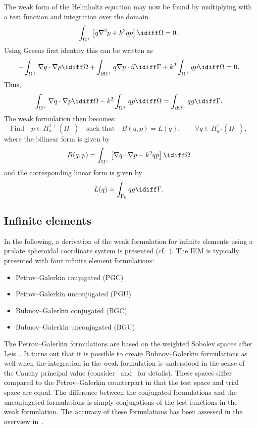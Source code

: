 The weak form of the Helmholtz equation may now be found by multiplying  with a test function and integration over the domain
\begin{equation*}
	\int_{\Omega^+} \left[q\nabla^2 p + k^2 qp\right]\idiff \Omega = 0.
\end{equation*}
Using Greens first identity this can be written as
\begin{equation*}
	-\int_{\Omega^+} \nabla q\cdot\nabla p\idiff\Omega + \int_{\partial\Omega^+} q\nabla p\cdot\vec{n}\idiff\Gamma + k^2\int_{\Omega^+}  qp\idiff \Omega = 0.
\end{equation*}
Thus,
\begin{equation}\label{Eq2:weakformulationHelmholtz}
	\int_{\Omega^+} \nabla q\cdot\nabla p\idiff\Omega -  k^2\int_{\Omega^+}qp\idiff\Omega = \int_{\partial\Omega^+} q g\idiff\Gamma.
\end{equation}
The weak formulation then becomes: 
\begin{equation}
	\text{Find} \quad p\in H_w^{1+}(\Omega^+)\quad\text{such that}\quad B(q,p) = L(q),\qquad \forall q\in H_{w^*}^1(\Omega^+),
\end{equation}
where the bilinear form is given by
\begin{equation*}
	B(q,p) = \int_{\Omega^+} \left[\nabla q\cdot\nabla p-  k^2qp\right]\idiff\Omega
\end{equation*}
and the corresponding linear form is given by
\begin{equation*}
	L(q) = \int_{\Gamma_0} qg\idiff\Gamma.
\end{equation*}


\subsection{Infinite elements}
\label{se:infElems}
In the following, a derivation of the weak formulation for infinite elements using a prolate spheroidal coordinate system is presented (cf.~\cite{Burnett1994atd}). The IEM is typically presented with four infinite element formulations:
\begin{itemize}
	\item Petrov--Galerkin conjugated (PGC)
	\item Petrov--Galerkin unconjugated (PGU)
	\item Bubnov--Galerkin conjugated (BGC)
	\item Bubnov--Galerkin unconjugated (BGU)
\end{itemize}
The Petrov--Galerkin formulations are based on the weighted Sobolev spaces after Leis~\cite{Leis1986ibv}. It turns out that it is possible to create Bubnov--Galerkin formulations as well when the integration in the weak formulation is understood in the sense of the Cauchy principal value (consider~\cite{Burnett1994atd} and~\cite{Gerdes1998tcv} for details). These spaces differ compared to the Petrov--Galerkin counterpart in that the test space and trial space are equal. The difference between the conjugated formulations and the unconjugated formulations is simply conjugations of the test functions in the weak formulation. The accuracy of these formulations has been assessed in the overview in~\cite{Astley2000ief}.

